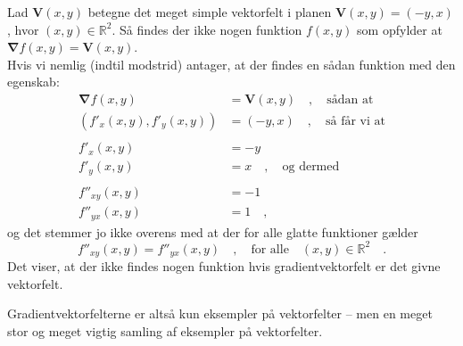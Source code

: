 \begin{example} \label{exampNonGradFelt}
Lad $\mathbf{V}(x,y)$ betegne det meget simple vektorfelt i planen $\mathbf{V}(x,y) = (-y, x)$, hvor $(x,y)\in \mathbb{R}^{2}$. Så findes der ikke nogen funktion $f(x,y)$ som opfylder at $\bm{\nabla}f(x,y) = \mathbf{V}(x,y)$. \\

Hvis vi nemlig (indtil modstrid) antager, at der findes en sådan funktion med den egenskab:
\begin{equation}
\begin{aligned}
\bm{\nabla}f(x,y) &= \mathbf{V}(x,y) \quad , \quad \textrm{sådan at} \\
\left(f'_{x}(x,y), f'_{y}(x,y) \right) &= (-y, x) \quad , \quad \textrm{så får vi at} \\ \\
f'_{x}(x,y) &= -y \\
f'_{y}(x,y) &= x \quad , \quad \textrm{og dermed} \\ \\
f''_{x y}(x,y) &= -1 \\
f''_{y x}(x,y) &= 1 \quad ,
\end{aligned}
\end{equation}
og det stemmer jo ikke overens med at der for alle glatte funktioner gælder
\begin{equation}
f''_{x y}(x,y) = f''_{yx}(x,y) \quad , \quad \textrm{for alle} \quad (x,y) \in \mathbb{R}^{2} \quad .
\end{equation}
Det viser, at der ikke findes nogen funktion hvis gradientvektorfelt er det givne vektorfelt.
\end{example}

\begin{think}
Gradientvektorfelterne er altså kun eksempler på vektorfelter -- men en meget stor og meget vigtig samling af eksempler på vektorfelter.
\end{think}

